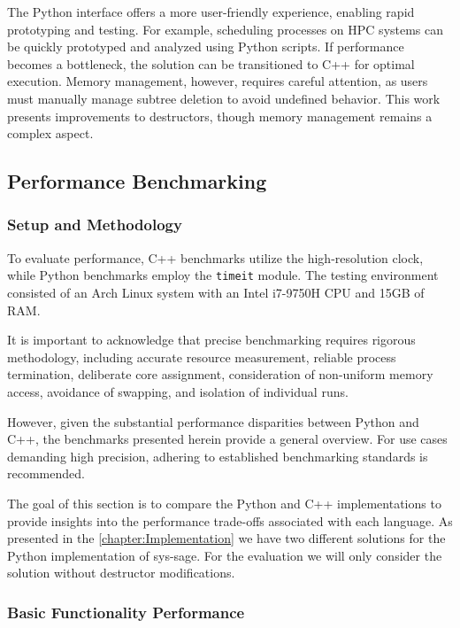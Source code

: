 The Python interface offers a more user-friendly experience, enabling rapid prototyping and testing. For example, scheduling processes on HPC systems can be quickly prototyped and analyzed using Python scripts. If performance becomes a bottleneck, the solution can be transitioned to C++ for optimal execution. Memory management, however, requires careful attention, as users must manually manage subtree deletion to avoid undefined behavior. This work presents improvements to destructors, though memory management remains a complex aspect.

\subsection{Performance Benchmarking}

\subsubsection{Setup and Methodology}

To evaluate performance, C++ benchmarks utilize the high-resolution clock, while Python benchmarks employ the \texttt{timeit} module. The testing environment consisted of an Arch Linux system with an Intel i7-9750H CPU and 15GB of RAM.

It is important to acknowledge that precise benchmarking requires rigorous methodology, including accurate resource measurement, reliable process termination, deliberate core assignment, consideration of non-uniform memory access, avoidance of swapping, and isolation of individual runs. \cite{beyer2019reliable}

However, given the substantial performance disparities between Python and C++, the benchmarks presented herein provide a general overview. For use cases demanding high precision, adhering to established benchmarking standards is recommended.

The goal of this section is to compare the Python and C++ implementations to provide insights into the performance trade-offs associated with each language. As presented in the \autoref{chapter:Implementation} we have two different solutions for the Python implementation of sys-sage. For the evaluation we will only consider the solution without destructor modifications.

\subsubsection{Basic Functionality Performance}

